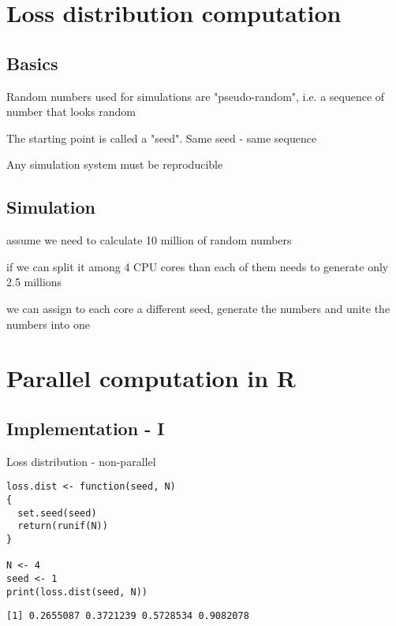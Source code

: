 \documentclass[bigger]{beamer}
\begin{document}
\section{Loss distribution computation}
\label{sec-2}
\subsection{Basics}
\label{sec-2-1}
\begin{frame}[label=sec-2-1-1]{Random numbers used for simulations are "pseudo-random", i.e. a sequence of number that looks random}
\end{frame}
\begin{frame}[label=sec-2-1-2]{The starting point is called a "seed". Same seed - same sequence}
\end{frame}
\begin{frame}[label=sec-2-1-3]{Any simulation system must be reproducible}
\end{frame}
\subsection{Simulation}
\label{sec-2-2}
\begin{frame}[label=sec-2-2-1]{assume we need to calculate 10 million of random numbers}
\end{frame}
\begin{frame}[label=sec-2-2-2]{if we can split it among 4 CPU cores than each of them needs to generate only 2.5 millions}
\end{frame}
\begin{frame}[label=sec-2-2-3]{we can assign to each core a different seed, generate the numbers and unite the numbers into one}
\end{frame}
\section{Parallel computation in R}
\label{sec-3}
\subsection{Implementation - I}
\label{sec-3-1}
\begin{frame}[fragile,label=sec-3-1-1]{Loss distribution - non-parallel}
 \begin{verbatim}
loss.dist <- function(seed, N)
{
  set.seed(seed)
  return(runif(N))
}

N <- 4
seed <- 1
print(loss.dist(seed, N))
\end{verbatim}

\begin{verbatim}
[1] 0.2655087 0.3721239 0.5728534 0.9082078
\end{verbatim}
\end{frame}
\end{document}

